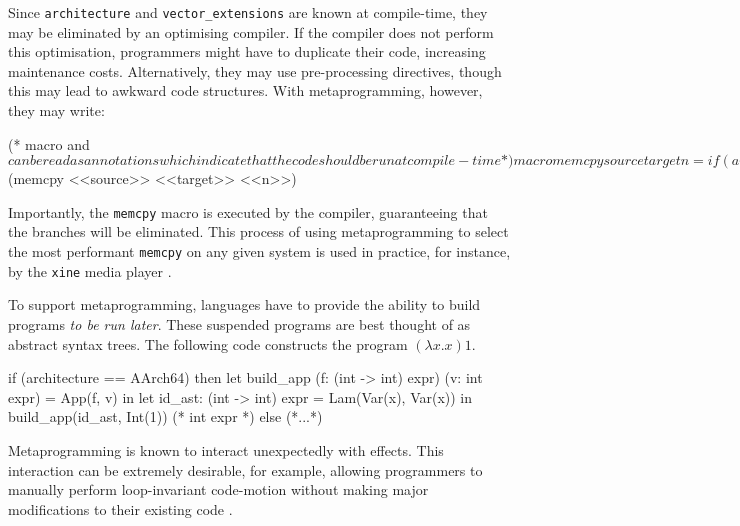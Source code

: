 Since \texttt{architecture} and \texttt{vector_extensions} are known at compile-time, they may be eliminated by an optimising compiler. If the compiler does not perform this optimisation, programmers might have to duplicate their code, increasing maintenance costs. Alternatively, they may use pre-processing directives, though this may lead to awkward code structures. With metaprogramming, however, they may write: 
\begin{macocaml}
(* macro and $ can be read as annotations which 
   indicate that the code should be run at compile-time *)
macro memcpy source target n = if (architecture == AArch64) then 
                               (* generate this program, to be run later *)
                             else 
                                match vector_extensions with
                                | None -> (* generate this program *)
                                | Some(AVX512) -> (* generate this program *)
                                | ...
$(memcpy <<source>> <<target>> <<n>>)
\end{macocaml}
Importantly, the \texttt{memcpy} macro is executed by the compiler, guaranteeing that the branches will be eliminated. This process of using metaprogramming to select the most performant \texttt{memcpy} on any given system is used in practice, for instance, by the \texttt{xine} media player \citep{huceke-memcpy}.

To support metaprogramming, languages have to provide the ability to build programs \textit{to be run later}. These suspended programs are best thought of as abstract syntax trees. The following code constructs the program $(\lambda x. x) 1$.
\begin{ocaml}
if (architecture == AArch64) then 
  let build_app (f: (int -> int) expr) (v: int expr) = App(f, v) in
  let id_ast: (int -> int) expr = Lam(Var(x), Var(x)) in
  build_app(id_ast, Int(1)) (* int expr *)
else 
  (*...*)
\end{ocaml}

Metaprogramming is known to interact unexpectedly with effects. This interaction can be extremely desirable, for example, allowing programmers to manually perform loop-invariant code-motion \citep{kiselyov-14} without making major modifications to their existing code \citep{lawall-94}. 

